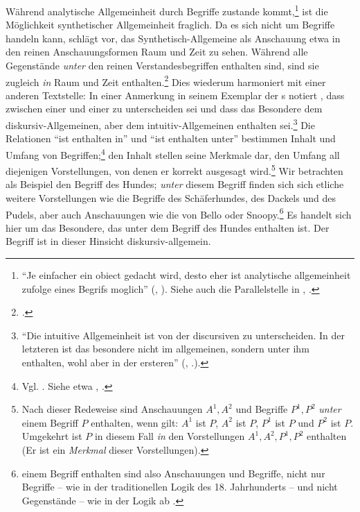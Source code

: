 Während analytische Allgemeinheit durch Begriffe zustande
kommt,\footnote{\enquote{Je einfacher ein obiect gedacht wird, desto eher ist
analytische allgemeinheit zufolge eines Begrifs moglich}
\mkbibparens{\cite[][]{Kant:Reflexionen1900ff.},
\cite[][XVI: 651.8--9]{Kant:GesammelteWerke1900ff.}}. Siehe auch die
Parallelstelle in \cite[][\S~21]{Kant:ImmanuelKantsLogik1977},
\cite[][IX: 102.33--103.2]{Kant:GesammelteWerke1900ff.}.} ist die Möglichkeit
synthetischer Allgemeinheit fraglich. Da es sich nicht um Begriffe handeln kann,
schlägt  vor, das
Synthetisch-Allgemeine als Anschauung etwa in den reinen Anschauungsformen Raum
und Zeit zu sehen. Während alle Gegenstände \emph{unter} den reinen
Verstandesbegriffen enthalten sind, sind sie zugleich \emph{in} Raum und Zeit
enthalten.\footnote{\cite[Vgl.][351]{Nuzzo:KantandtheUnityofReason2005}.} Dies
wiederum harmoniert mit einer anderen Textstelle:
In einer Anmerkung in seinem Exemplar der 
s notiert
, dass zwischen einer  und einer  zu
unterscheiden sei und dass das Besondere  dem
dis\-kur\-siv-All\-ge\-mei\-nen, aber  dem
in\-tui\-tiv-All\-ge\-mei\-nen enthalten sei.\footnote{\enquote{Die intuitive
Allgemeinheit ist von der discursiven zu unterscheiden.
In der letzteren ist das besondere nicht im allgemeinen, sondern unter ihm 	  	  	 
enthalten, wohl aber in der
ersteren} \mkbibparens{\cite[][]{Kant:Reflexionen1900ff.},
\cite[][XVIII: 481.4--6]{Kant:GesammelteWerke1900ff.}.}.}
Die Relationen \enquote{ist enthalten in} und \enquote{ist enthalten unter}
bestimmen Inhalt und Umfang von
Begriffen;\footnote{Vgl. \cite[][87]{Stuhlmann-Laeisz:KantsLogik1976}. Siehe
etwa \cite[][\S~7]{Kant:ImmanuelKantsLogik1977},
\cite[][IX: 95.27--30]{Kant:GesammelteWerke1900ff.}.} den Inhalt stellen
seine Merkmale dar, den Umfang all diejenigen Vorstellungen, von denen er
korrekt ausgesagt wird.\footnote{Nach dieser Redeweise sind Anschauungen $A^1, A^2$ und Begriffe $P^1, P^2$
\emph{unter} einem Begriff $P$ enthalten, wenn gilt:
$A^1$ ist $P$, $A^2$ ist $P$, $P^1$ ist $P$ und $P^2$ ist $P$. Umgekehrt ist $P$
in diesem Fall \emph{in} den Vorstellungen $A^1, A^2, P^1, P^2$ enthalten (Er
ist ein \emph{Merkmal} dieser Vorstellungen).} Wir betrachten als Beispiel den
Begriff des Hundes; \emph{unter} diesem Begriff finden sich sich etliche weitere
Vorstellungen wie die Begriffe des Schäferhundes, des Dackels und des Pudels,
aber auch Anschauungen wie die von Bello oder
Snoopy.\footnote{ einem Begriff enthalten sind also
Anschauungen und Begriffe, nicht nur Begriffe -- wie in der traditionellen Logik
des 18. Jahrhunderts -- und nicht Gegenstände -- wie in der Logik ab
\parencite[vgl.][\pno~87\,f.]{Stuhlmann-Laeisz:KantsLogik1976}.} Es handelt sich
hier um das Besondere, das unter dem Begriff des Hundes enthalten ist. Der
Begriff ist in dieser Hinsicht diskursiv-allgemein.

